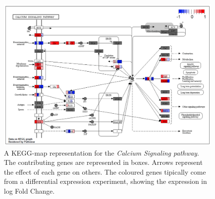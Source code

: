 \begin{figure}[H]
\includegraphics[width=12cm, keepaspectratio]{img/ticorser/keggmap_example.png}
\caption[\gls{tic} keggmap]{A KEGG-map representation for the \textit{Calcium Signaling pathway}. The contributing genes are represented in boxes. Arrows represent the effect of each gene on others. The coloured genes tipically come from a differential expression experiment, showing the expression in log Fold Change.}
\label{fig:ticorserkeggmap}
\centering
\end{figure}









